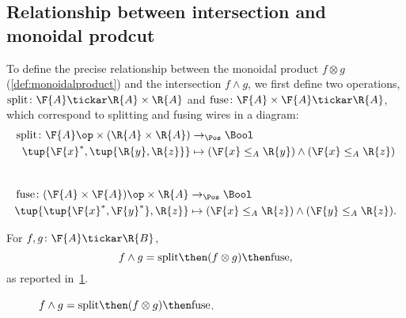 \subsection{Relationship between intersection and monoidal prodcut}
To define the precise relationship between the monoidal product $f \otimes g$ (\cref{def:monoidalproduct}) and the intersection $f \wedge g$, we first define two operations, $\text{split} \colon \F{A} \tickar \R{A} \times \R{A}$ and $\text{fuse} \colon \F{A} \times \F{A} \tickar \R{A}$, which correspond to splitting and fusing wires in a diagram:
\begin{equation}
\begin{aligned}
    \text{split} \colon \F{A}\op \times (\R{A} \times \R{A}) &\to_\Pos \Bool \\
    \tup{\F{x}^*, \tup{\R{y}, \R{z}}} &\mapsto (\F{x} \leq_A \R{y}) \wedge (\F{x} \leq_A \R{z})
\end{aligned}
\end{equation}
~
\begin{equation}
\begin{aligned}
    \text{fuse} \colon (\F{A} \times \F{A})\op \times \R{A} &\to_\Pos \Bool \\
    \tup{ \tup{\F{x}^*, \F{y}^*}, \R{z}} &\mapsto (\F{x} \leq_A \R{z}) \wedge (\F{y} \leq_A \R{z}).
\end{aligned}
\end{equation}

\begin{lemma}
\label{lemma:intersection}
For $f,g \colon \F{A} \tickar \R{B}$,
\begin{equation}
f \wedge g = \text{split} \then (f \otimes g) \then \text{fuse},
\end{equation}
as reported in~\cref{fig:lemmasplitfuse}.
\begin{figure}[h!]
\begin{center}
\end{center}
\caption{$f \wedge g = \text{split} \then (f \otimes g) \then \text{fuse}$. \label{fig:lemmasplitfuse}}
\end{figure}
\end{lemma}


